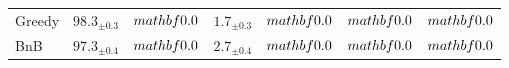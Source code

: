 \begin{tabular}{lcccccc}
Greedy & $98.3_{\pm 0.3}$ & $\\mathbf{0.0}$ & $1.7_{\pm 0.3}$ & $\\mathbf{0.0}$ & $\\mathbf{0.0}$ & $\\mathbf{0.0}$ \\
BnB & $97.3_{\pm 0.4}$ & $\\mathbf{0.0}$ & $2.7_{\pm 0.4}$ & $\\mathbf{0.0}$ & $\\mathbf{0.0}$ & $\\mathbf{0.0}$ \\
\bottomrule
\end{tabular}

